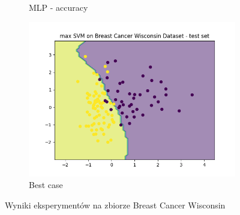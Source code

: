 \documentclass[12pt]{article}
\newcommand*{\subfigwidth}{0.24\textwidth}
\begin{document}
\begin{figure}[H]
\begin{subfigure}[t]{\subfigwidth}
        \caption{MLP - accuracy}
    \end{subfigure}
    \hfill
    \begin{subfigure}[t]{\subfigwidth}
        \includegraphics[width=\linewidth]{img/other_datasets/svm/breast_max_test_boundary.png}
        \caption{Best case}
    \end{subfigure}
    \caption{Wyniki eksperymentów na zbiorze Breast Cancer Wisconsin}
\end{figure}
\end{document}
